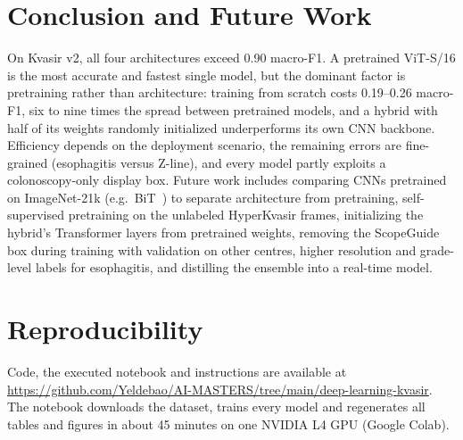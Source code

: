 \documentclass[conference]{IEEEtran}
\begin{document}
\section{Conclusion and Future Work}
On Kvasir v2, all four architectures exceed 0.90 macro-F1. A pretrained ViT-S/16 is the most accurate and fastest
single model, but the dominant factor is pretraining rather than architecture: training from scratch costs 0.19--0.26
macro-F1, six to nine times the spread between pretrained models, and a hybrid with half of its weights randomly
initialized underperforms its own CNN backbone. Efficiency depends on the deployment scenario, the remaining errors are
fine-grained (esophagitis versus Z-line), and every model partly exploits a colonoscopy-only display box. Future work
includes comparing CNNs pretrained on ImageNet-21k (e.g.\ BiT~\cite{kolesnikov2020bit}) to separate architecture from
pretraining, self-supervised pretraining on the unlabeled HyperKvasir frames, initializing the hybrid's Transformer
layers from pretrained weights, removing the ScopeGuide box during training with validation on other centres, higher
resolution and grade-level labels for esophagitis, and distilling the ensemble into a real-time model.

\section*{Reproducibility}
Code, the executed notebook and instructions are available at
\url{https://github.com/Yeldebao/AI-MASTERS/tree/main/deep-learning-kvasir}. The notebook downloads the dataset,
trains every model and regenerates all tables and figures in about 45 minutes on one NVIDIA L4 GPU (Google Colab).
\end{document}
